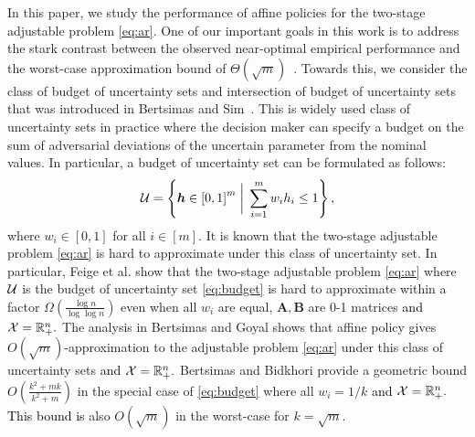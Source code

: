 \documentclass[moor]{informs1}              %
\newcommand{\mb}[1]{\ensuremath{\boldsymbol{#1}}}
\newcommand*{\red}{\textcolor{black}}
\begin{document}
In this paper, we study the performance of affine policies for the two-stage adjustable problem \eqref{eq:ar}. One of our important goals in this work is to address the stark contrast between the observed near-optimal empirical performance and the worst-case approximation bound of $\Theta(\sqrt m)$~\cite{BG10}. Towards this, we consider the class of budget of uncertainty sets and intersection of budget of uncertainty sets that was introduced in Bertsimas and Sim~\cite{BS04}. This is widely used class of uncertainty sets in practice where the decision maker can specify a budget on the sum of adversarial deviations of the uncertain parameter from the nominal values. In particular, a budget of uncertainty set can be formulated as follows:
\begin{equation}\label{eq:budget}
{\cal U}= \left\{ \mb h \in {[ 0, 1]}^m \; \bigg\vert \; \sum _{i=1}^m  w_i h_i  \leq  1 \right\},
\end{equation}
where $ w_i \in [0,1]$ for all $i \in [m]$. It is known that the two-stage adjustable problem \eqref{eq:ar}  is hard to approximate under this class of uncertainty set. In particular, Feige et al. \cite{FJMM07} show that the two-stage adjustable problem \eqref{eq:ar} where $\cal U$ is the budget of uncertainty set \eqref{eq:budget} is hard to approximate within a factor $\Omega( \frac{\log n}{\log \log n})$ even when all $w_i$ are equal, $\mb A,\mb B$ are 0-1 matrices \red{ and ${\cal X}= \mathbb{R}_+^n.$} The analysis in Bertsimas and Goyal \cite{BG10} shows that affine policy gives  $O( \sqrt{m})$-approximation to the adjustable problem \eqref{eq:ar} under this class of uncertainty sets \red{ and ${\cal X}= \mathbb{R}_+^n.$}  Bertsimas and Bidkhori \cite{bertsimas2014performance} provide a geometric bound  $O ( \frac{k^2+mk}{k^2+m} )$ in the special case  of \eqref{eq:budget}  where all $w_i=1/k$ \red{ and ${\cal X}= \mathbb{R}_+^n.$ This bound is} also $O(\sqrt m)$ in the worst-case for $k=\sqrt m$.
\end{document}
